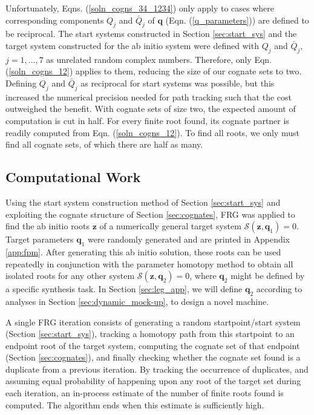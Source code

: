 \documentclass[journal]{IEEEtran}
\def\*#1{\bar{#1}} %
\begin{document}
Unfortunately, Eqns. (\ref{soln_cogns_34_1234}) only apply to cases where corresponding components $Q_j$ and $\*Q_j$ of $\mathbf{q}$ (Eqn. (\ref{q_parameters})) are defined to be reciprocal.
The start systems constructed in Section \ref{sec:start_sys} and the target system constructed for the ab initio system were defined with $Q_j$ and $\*Q_j$, $j=1,\ldots,7$ as unrelated random complex numbers.
Therefore, only Eqn. (\ref{soln_cogns_12}) applies to them, reducing the size of our cognate sets to two.
Defining $Q_j$ and $\*Q_j$ as reciprocal for start systems was possible, but this increased the numerical precision needed for path tracking such that the cost outweighed the benefit.
With cognate sets of size two, the expected amount of computation is cut in half.
For every finite root found, its cognate partner is readily computed from Eqn. (\ref{soln_cogns_12}).
To find all roots, we only must find all cognate sets, of which there are half as many.


\subsection{Computational Work}
\label{sec:computations}

Using the start system construction method of Section \ref{sec:start_sys} and exploiting the cognate structure of Section \ref{sec:cognates}, FRG was applied to find the ab initio roots $\mathbf{z}$ of a numerically general target system $\mathcal{S}(\mathbf{z},\mathbf{q}_1)=0$.
Target parameters $\mathbf{q}_1$ were randomly generated and are printed in Appendix \ref{app:fpm}.
After generating this ab initio solution, these roots can be used repeatedly in conjunction  with the parameter homotopy method to obtain all isolated roots for any other system $\mathcal{S}(\mathbf{z},\mathbf{q}_2)=0$, where $\mathbf{q}_2$ might be defined by a specific synthesis task.
In Section \ref{sec:leg_app}, we will define $\mathbf{q}_2$ according to analyses in Section \ref{sec:dynamic_mock-up}, to design a novel machine.



A single FRG iteration consists of generating a random startpoint/start system (Section \ref{sec:start_sys}), tracking a homotopy path from this startpoint to an endpoint root of the target system, computing the cognate set of that endpoint (Section \ref{sec:cognates}), and finally checking whether the cognate set found is a duplicate from a previous iteration.
By tracking the occurrence of duplicates, and assuming equal probability of happening upon any root of the target set during each iteration, an in-process estimate of the number of finite roots found is computed.
The algorithm ends when this estimate is sufficiently high.
\end{document}
